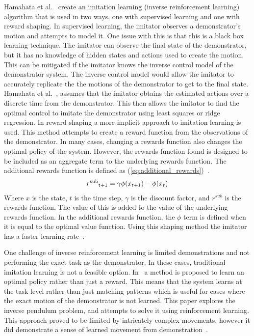 \documentclass[12pt,american]{report}
\begin{document}
		Hamahata et al.~\cite{hamahata2008effective} create an imitation learning (inverse reinforcement learning) algorithm that is used in two ways, one with supervised learning and one with reward shaping. In supervised learning, the imitator observes a demonstrator's motion and attempts to model it. One issue with this is that this is a black box learning technique.  The imitator can observe the final state of the demonstrator, but it has no knowledge of hidden states and actions used to create the motion. This can be mitigated if the imitator knows the inverse control model of the demonstrator system. The inverse control model would allow the imitator to accurately replicate the the motions of the demonstrator to get to the final state. Hamahata et al.~\cite{hamahata2008effective}, assumes that the imitator obtains the estimated actions over a discrete time from the demonstrator.  This then allows the imitator to find the optimal control to imitate the demonstrator using least squares or ridge regression. In reward shaping a more implicit approach to imitation learning is used. This method attempts to create a reward function from the observations of the demonstrator.  In many cases, changing a rewards function also changes the optimal policy of the system.  However, the rewards function found is designed to be included as an aggregate term to the underlying rewards function. The additional rewards function is defined as (\ref{eq:additional_rewards})~\cite{hamahata2008effective}.
		\begin{equation}
            \label{eq:additional_rewards}
            r\textsuperscript{sub}\textsubscript{t+1}= \gamma\phi(x_{t+1})-\phi(x_{t})
        \end{equation}
		Where $x$ is the state, $t$ is the time step, $\gamma$ is the discount factor, and $r^{sub}$ is the rewards function. The value of this is added to the value of the underlying rewards function. In the additional rewards function, the \textit{$\phi$} term is defined when it is equal to the optimal value function. Using this shaping method the imitator has a faster learning rate~\cite{hamahata2008effective}.

		One challenge of inverse reinforcement learning is limited demonstrations and not performing the exact task as the demonstrator. In these cases, traditional imitation learning is not a feasible option. In~\cite{atkeson1997robot} a method is proposed to learn an optimal policy rather than just a reward. This means that the system learns at the task level rather than just matching patterns which is useful for cases where the exact motion of the demonstrator is not learned. This paper explores the inverse pendulum problem, and attempts to solve it using reinforcement learning. This approach proved to be limited by intricately complex movements, however it did demonstrate a sense of learned movement from demonstration~\cite{atkeson1997robot}.
\end{document}
